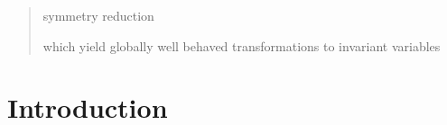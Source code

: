 \documentclass[aip,cha,showpacs,reprint]{revtex4-1} %
\begin{document}
\begin{quotation}
symmetry reduction

which yield {globally} well behaved
transformations to invariant variables

\end{quotation}

\section{Introduction\label{s:intro}}
\end{document}

